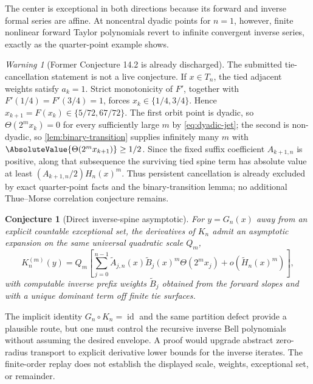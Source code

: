 \documentclass[11pt,oneside]{article}
\newtheorem{conjecture}[theorem]{Conjecture}
\theoremstyle{definition}
\theoremstyle{remark}
\newtheorem{warning}[theorem]{Warning}
\newcommand{\id}{\operatorname{id}}
\newcommand{\comp}{\mathbin{\circ}}
\newcommand{\ThetaF}{\Theta}
\begin{document}
The center is exceptional in both directions because its forward and inverse formal
series are affine.  At noncentral dyadic points for $n=1$, however, finite nonlinear
forward Taylor polynomials revert to infinite convergent inverse series, exactly as the
quarter-point example shows.

\begin{warning}[Former Conjecture 14.2 is already discharged]
\label{warn:ties}
The submitted tie-cancellation statement is not a live conjecture.  If
$x\in T_n$, the tied adjacent weights satisfy $a_k=1$.  Strict monotonicity of $F'$,
together with $F'(1/4)=F'(3/4)=1$, forces
$x_k\in\{1/4,3/4\}$.  Hence
$x_{k+1}=F(x_k)\in\{5/72,67/72\}$.  The first orbit point is dyadic, so
$\ThetaF(2^m x_k)=0$ for every sufficiently large $m$ by
\eqref{eq:dyadic-jet}; the second is non-dyadic, so
\cref{lem:binary-transition} supplies infinitely many $m$ with
$\AbsoluteValue{\ThetaF(2^m x_{k+1})}\geq1/2$.  Since the fixed suffix coefficient
$A_{k+1,n}$ is positive, along that subsequence the surviving tied spine term has
absolute value at least $(A_{k+1,n}/2)H_n(x)^m$.  Thus persistent cancellation is
already excluded by exact quarter-point facts and the binary-transition lemma; no
additional Thue--Morse correlation conjecture remains.
\end{warning}

\begin{conjecture}[Direct inverse-spine asymptotic]
\label{conj:inverse-spine}
For $y=G_n(x)$ away from an explicit countable exceptional set, the derivatives of
$K_n$ admit an asymptotic expansion on the same universal quadratic scale $Q_m$,
\[
 K_n^{(m)}(y)=Q_m\left[
   \sum_{j=0}^{n-1}\widetilde A_{j,n}(x)
   \widetilde B_j(x)^m\Theta(2^m x_j)
   +o(\widetilde H_n(x)^m)
 \right],
\]
with computable inverse prefix weights $\widetilde B_j$ obtained from the forward
slopes and with a unique dominant term off finite tie surfaces.
\end{conjecture}

The implicit identity $G_n\comp K_n=\id$ and the same partition defect provide a
plausible route, but one must control the recursive inverse Bell polynomials without
assuming the desired envelope.  A proof would upgrade abstract zero-radius transport
to explicit derivative lower bounds for the inverse iterates.  The finite-order replay
does not establish the displayed scale, weights, exceptional set, or remainder.
\end{document}
